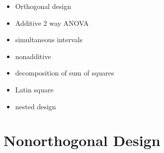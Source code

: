\documentclass[11pt,fleqn]{book} %
\begin{document}
\begin{itemize}
	\item Orthogonal design
	\item Additive 2 way ANOVA
	\item simultaneous intervals
	\item nonadditive
	\item decomposition of sum of squares
	\item Latin square
	\item nested design
\end{itemize}








\chapter{Nonorthogonal Design}
\end{document}
